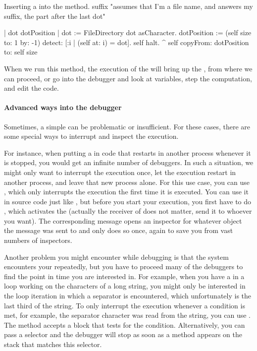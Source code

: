 \documentclass[a4paper,10pt,twoside]{book}
\begin{document}
\needspace{11ex}
\begin{method}[suffix]{Inserting a  into the  method.}
suffix
	"assumes that I'm a file name, and answers my suffix, the part after the last dot"

	| dot dotPosition |
	dot := FileDirectory dot asCharacter.
	dotPosition := (self size to: 1 by: -1) detect: [:i | (self at: i) = dot].
	self halt.
	^ self copyFrom: dotPosition to: self size
\end{method}

When we run this method, the execution of the  will bring up the , from where we can proceed, or go into the debugger and look at variables, step the computation, and edit the code.

\paragraph{Advanced ways into the debugger}

Sometimes, a simple  can be problematic or insufficient.
For these cases, there are some special ways to interrupt and inspect the execution.

For instance, when putting a  in code that restarts in another process whenever it is stopped, you would get an infinite number of debuggers.
In such a situation, we might only want to interrupt the execution once, let the execution restart in another process, and leave that new process alone.
For this use case, you can use , which only interrupts the execution the first time it is executed.
You can use it in source code just like , but before you start your execution, you first have to do , which activates the  (actually the receiver of  does not matter, send it to whoever you want).
The corresponding message  opens an inspector for whatever object the message was sent to and only does so once, again to save you from vast numbers of inspectors.

Another problem you might encounter while debugging is that the system encounters your  repeatedly, but you have to proceed many of the debuggers to find the point in time you are interested in.
For example, when you have a  in a loop working on the characters of a long string, you might only be interested in the loop iteration in which a separator is encountered, which unfortunately is the last third of the string.
To only interrupt the execution whenever a condition is met, for example, the separator character was read from the string, you can use .
The method accepts a block that tests for the condition.
Alternatively, you can pass a selector and the debugger will stop as soon as a method appears on the stack that matches this selector.
\end{document}
